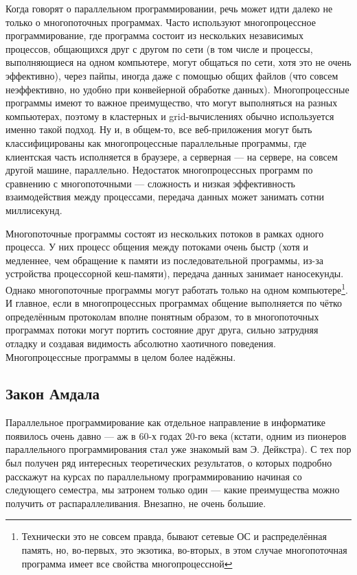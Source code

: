 \documentclass{../../text-style}
\begin{document}
Когда говорят о параллельном программировании, речь может идти далеко не только о многопоточных программах. Часто используют многопроцессное программирование, где программа состоит из нескольких независимых процессов, общающихся друг с другом по сети (в том числе и процессы, выполняющиеся на одном компьютере, могут общаться по сети, хотя это не очень эффективно), через пайпы, иногда даже с помощью общих файлов (что совсем неэффективно, но удобно при конвейерной обработке данных). Многопроцессные программы имеют то важное преимущество, что могут выполняться на разных компьютерах, поэтому в кластерных и grid-вычислениях обычно используется именно такой подход. Ну и, в общем-то, все веб-приложения могут быть классифицированы как многопроцессные параллельные программы, где клиентская часть исполняется в браузере, а серверная --- на сервере, на совсем другой машине, параллельно. Недостаток многопроцессных программ по сравнению с многопоточными --- сложность и низкая эффективность взаимодействия между процессами, передача данных может занимать сотни миллисекунд.

Многопоточные программы состоят из нескольких потоков в рамках одного процесса. У них процесс общения между потоками очень быстр (хотя и медленнее, чем обращение к памяти из последовательной программы, из-за устройства процессорной кеш-памяти), передача данных занимает наносекунды. Однако многопоточные программы могут работать только на одном компьютере\footnote{Технически это не совсем правда, бывают сетевые ОС и распределённая память, но, во-первых, это экзотика, во-вторых, в этом случае многопоточная программа имеет все свойства многопроцессной}. И главное, если в многопроцессных программах общение выполняется по чётко определённым протоколам вполне понятным образом, то в многопоточных программах потоки могут портить состояние друг друга, сильно затрудняя отладку и создавая видимость абсолютно хаотичного поведения. Многопроцессные программы в целом более надёжны.

\subsection{Закон Амдала}

Параллельное программирование как отдельное направление в информатике появилось очень давно --- аж в 60-х годах 20-го века (кстати, одним из пионеров параллельного программирования стал уже знакомый вам Э. Дейкстра). С тех пор был получен ряд интересных теоретических результатов, о которых подробно расскажут на курсах по параллельному программированию начиная со следующего семестра, мы затронем только один --- какие преимущества можно получить от распараллеливания. Внезапно, не очень большие.
\end{document}
